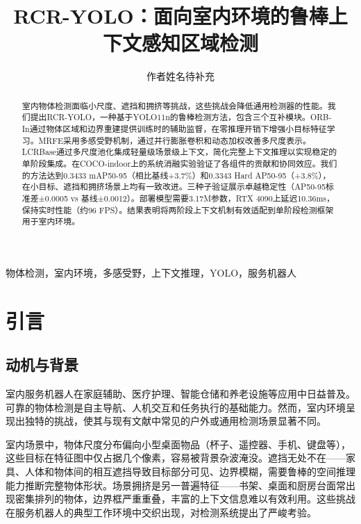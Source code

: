 \documentclass[journal]{IEEEtran}
\title{RCR-YOLO：面向室内环境的鲁棒上下文感知区域检测}
\author{作者姓名待补充}
\begin{document}
\maketitle

\begin{abstract}
室内物体检测面临小尺度、遮挡和拥挤等挑战，这些挑战会降低通用检测器的性能。我们提出RCR-YOLO，一种基于YOLO11n的鲁棒检测方法，包含三个互补模块。ORB-In通过物体区域和边界重建提供训练时的辅助监督，在零推理开销下增强小目标特征学习。MRFE采用多感受野机制，通过并行膨胀卷积和动态加权改善多尺度表示。LCRBase通过多尺度池化集成轻量级场景级上下文，简化完整上下文推理以实现稳定的单阶段集成。在COCO-indoor上的系统消融实验验证了各组件的贡献和协同效应。我们的方法达到0.3433 mAP50-95（相比基线+3.7\%）和0.3343 Hard AP50-95（+3.8\%），在小目标、遮挡和拥挤场景上均有一致改进。三种子验证展示卓越稳定性（AP50-95标准差±0.0005 vs 基线±0.0012）。部署模型需要3.17M参数，RTX 4090上延迟10.36ms，保持实时性能（约96 FPS）。结果表明将两阶段上下文机制有效适配到单阶段检测框架用于室内环境。
\end{abstract}

\begin{IEEEkeywords}
物体检测，室内环境，多感受野，上下文推理，YOLO，服务机器人
\end{IEEEkeywords}

\section{引言}
\label{sec:introduction}

\subsection{动机与背景}
\label{subsec:motivation}

室内服务机器人在家庭辅助、医疗护理、智能仓储和养老设施等应用中日益普及\cite{service_robot1,service_robot2}。可靠的物体检测是自主导航、人机交互和任务执行的基础能力。然而，室内环境呈现出独特的挑战，使其与现有文献中常见的户外或通用检测场景显著不同。

室内场景中，物体尺度分布偏向小型桌面物品（杯子、遥控器、手机、键盘等），这些目标在特征图中仅占据几个像素，容易被背景杂波淹没。遮挡无处不在——家具、人体和物体间的相互遮挡导致目标部分可见、边界模糊，需要鲁棒的空间推理能力推断完整物体形状。场景拥挤是另一普遍特征——书架、桌面和厨房台面常出现密集排列的物体，边界框严重重叠，丰富的上下文信息难以有效利用。这些挑战在服务机器人的典型工作环境中交织出现，对检测系统提出了严峻考验。
\end{document}
